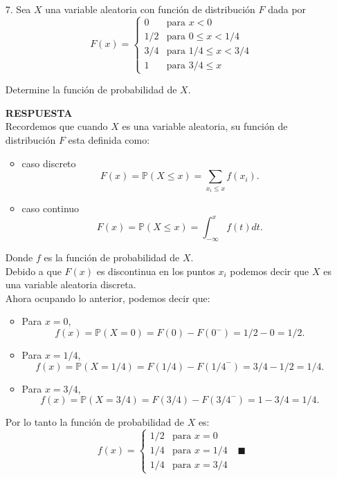 \documentclass[11pt,letterpaper]{article}
\newcommand{\mP}{\mathbb{P}}
\newcommand{\res}{\textbf{RESPUESTA}\\}
\begin{document}
\begin{itemize}
\item[7.] Sea $X$ una variable aleatoria con función de distribución $F$ dada por
\begin{equation*}
F(x) = \left\{\begin{array}{ll}
0 & \text{para } x<0\\
1/2 & \text{para } 0 \leq x <1/4\\
3/4 & \text{para } 1/4\leq x< 3/4\\
1 & \text{para } 3/4 \leq x
\end{array} \right.
\end{equation*}

Determine la función de probabilidad de $X$.

\res 
Recordemos que cuando $X$ es una variable aleatoria, su función de distribución $F$ esta definida como:

\begin{itemize}
\item caso discreto
$$F(x) =\mP(X\leq x)= \sum_{x_i\leq x} f(x_i).$$

\item caso continuo
$$F(x) = \mP(X\leq x)= \int_{-\infty}^x f(t) dt.$$
\end{itemize}
Donde $f$ es la función de probabilidad de $X$. \\

Debido a que $F(x)$ es discontinua en los puntos $x_i$ podemos decir que $X$ es una variable aleatoria discreta.\\
Ahora ocupando lo anterior, podemos decir que:
\begin{itemize}
\item Para $x=0$,
$$ f(x)= \mP(X=0)= F(0)-F({0}^-)=1/2-0=1/2.$$

\item Para $x=1/4$,
$$ f(x)= \mP(X=1/4)= F(1/4)-F({1/4}^-)=3/4-1/2=1/4.$$

\item Para $x=3/4$,
$$ f(x)= \mP(X=3/4)= F(3/4)-F({3/4}^-)=1-3/4=1/4.$$
\end{itemize}
Por lo tanto la función de probabilidad de $X$ es: 
\begin{equation*}
f(x) = \left\{\begin{array}{ll}
1/2 & \text{para } x=0\\
1/4 & \text{para } x =1/4\\
1/4 & \text{para } x=3/4
\end{array} \right.\ \ \ \blacksquare
\end{equation*}


\end{itemize}
\end{document}
